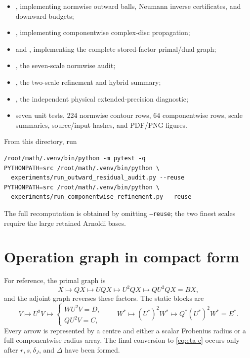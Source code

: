 \documentclass[11pt]{article}
\theoremstyle{definition}
\theoremstyle{remark}
\begin{document}
\begin{itemize}
 \item {}, implementing normwise
 outward balls, Neumann inverse certificates, and downward budgets;
 \item {}, implementing
 componentwise complex-disc propagation;
 \item {} and
 , implementing the complete stored-factor
 primal/dual graph;
 \item {}, the seven-scale
 normwise audit;
 \item {}, the two-scale
 refinement and hybrid summary;
 \item {}, the
 independent physical extended-precision diagnostic;
 \item seven unit tests, 224 normwise contour rows, 64 componentwise rows,
 scale summaries, source/input hashes, and PDF/PNG figures.
\end{itemize}

From this directory, run
\begin{verbatim}
/root/math/.venv/bin/python -m pytest -q
PYTHONPATH=src /root/math/.venv/bin/python \
  experiments/run_outward_residual_audit.py --reuse
PYTHONPATH=src /root/math/.venv/bin/python \
  experiments/run_componentwise_refinement.py --reuse
\end{verbatim}
The full recomputation is obtained by omitting \texttt{--reuse}; the two
finest scales require the large retained Arnoldi bases.

\section{Operation graph in compact form}
\label{app:graph}

For reference, the primal graph is
\[
 X\mapsto QX\mapsto UQX\mapsto U^2QX\mapsto QU^2QX=BX,
\]
and the adjoint graph reverses these factors.  The static blocks are
\[
 V\mapsto U^2V\mapsto
 \begin{cases}
 WU^2V=D,\\
 QU^2V=C,
 \end{cases}
 \qquad
 W^*\mapsto (U^*)^2W^*\mapsto Q^*(U^*)^2W^*=E^*.
\]
Every arrow is represented by a centre and either a scalar Frobenius radius
or a full componentwise radius array.  The final conversion to
\cref{eq:eta-c} occurs only after \(r,s,\delta_J\), and \(\Delta\) have been
formed.



\end{document}
